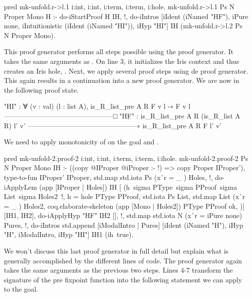 \documentclass[thesis.tex]{subfiles}
\begin{document}
\begin{elpicode}
  pred mk-unfold.r->l.1 i:int, i:int, 
                        i:term, i:term, i:hole.
  mk-unfold.r->l.1 Ps N Proper Mono H :-
    do-iStartProof H IH, !,
    do-iIntros [iIdent (iNamed "HF"), iPure none, 
                iIntuitionistic (iIdent (iNamed "HI")), 
                iHyp "HI"] IH 
               (mk-unfold.r->l.2 Ps N Proper Mono).
\end{elpicode}
This proof generator performs all steps possible using the  proof generator. It takes the same arguments as . On line 3, it initializes the Iris context and thus creates an Iris hole, . Next, we apply several proof steps using de  proof generator. This again results in a continuation into a new proof generator. We are now in the following proof state.
\begin{coqcode}
  "HI" : ∀ (v : val) (l : list A), 
          is_R_list_pre A R F v l -∗ F v l
  ------------------------------------------------□
  "HF" : is_R_list_pre A R (is_R_list A R) l' v'
  ------------------------------------------------∗
  is_R_list_pre A R F l' v'
\end{coqcode}
We need to apply monotonicity of  on the goal and .
\begin{elpicode}
  pred mk-unfold-2.proof-2 i:int, i:int, 
                           i:term, i:term, i:ihole.
  mk-unfold-2.proof-2 Ps N Proper Mono IH :-
    ((copy {{ @IProper }} {{ @iProper }} :- !) => 
      copy Proper IProper'),
    type-to-fun IProper' IProper,
    std.map {std.iota Ps} (x\r\ r = {{ _ }}) Holes, !,
    do-iApplyLem (app [IProper | Holes]) IH [
      (h\ sigma PType\ sigma PProof\ 
          sigma List\ sigma Holes2\ !,
        h = hole PType PProof,
        std.iota Ps List,
        std.map List (x\r\ r = {{ _ }}) Holes2,
        coq.elaborate-skeleton (app [Mono | Holes2]) 
                               PType PProof ok,
    )] [IH1, IH2],
    do-iApplyHyp "HF" IH2 [], !,
    std.map {std.iota N} (x\r\ r = iPure none) Pures, !,
    do-iIntros 
      {std.append [iModalIntro | Pures] 
                  [iIdent (iNamed "H"), iHyp "H", 
                   iModalIntro, iHyp "HI"]} 
      IH1 (ih\ true).
\end{elpicode}
We won't discuss this last proof generator in full detail but explain what is generally accomplished by the different lines of code. The proof generator again takes the same arguments as the previous two steps.
Lines 4-7 transform the signature of the pre fixpoint function into the following statement we can apply to the goal.
\end{document}
